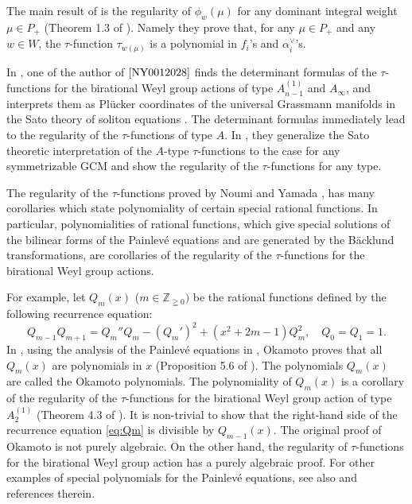 \documentclass[12pt,twoside]{article}
\newcommand\av{\alpha^\vee}
\newcommand\Z{{\mathbb Z}} %
\theoremstyle{plain} %
\theoremstyle{definition} %
\theoremstyle{definition} %
\numberwithin{theorem}{section}
\numberwithin{equation}{section}
\numberwithin{figure}{section}
\numberwithin{table}{section}
\begin{document}
The main result of \cite{NY0012028} is the regularity of $\phi_w(\mu)$ 
for any dominant integral weight $\mu\in P_+$ (Theorem 1.3 of \cite{NY0012028}).
Namely they prove that, for any $\mu\in P_+$ and any $w\in W$, 
the $\tau$-function $\tau_{w(\mu)}$ is a polynomial in $f_i$'s and $\av_i$'s.

In \cite{Yamada9808002}, one of the author of $\cite{NY0012028}$ finds
the determinant formulas of the $\tau$-functions 
for the birational Weyl group actions of type $A^{(1)}_{n-1}$ and $A_\infty$,
and interprets them as Pl\"ucker coordinates of
the universal Grassmann manifolds in the Sato theory of soliton equations \cite{Sato-Sato}.
The determinant formulas immediately lead to 
the regularity of the $\tau$-functions of type $A$.
In \cite{NY0012028}, they generalize the Sato theoretic interpretation of 
the $A$-type $\tau$-functions to the case for any symmetrizable GCM
and show the regularity of the $\tau$-functions for any type.

The regularity of the $\tau$-functions proved by Noumi and Yamada \cite{Yamada9808002}, \cite{NY0012028}
has many corollaries which state polynomiality of certain special rational functions. 
In particular, polynomialities of rational functions, 
which give special solutions of the bilinear forms of the Painlev\'e equations 
and are generated by the B\"acklund transformations, 
are corollaries of the regularity of the $\tau$-functions
for the birational Weyl group actions.

For example, let $Q_m(x)$ ($m\in\Z_{\geqq0})$ be the rational functions 
defined by the following recurrence equation:
\begin{equation}
 Q_{m-1} Q_{m+1} = Q_m'' Q_m - (Q_m')^2 + (x^2+2m-1)Q_m^2,
 \quad Q_0=Q_1=1.
\label{eq:Qm}
\end{equation}
In \cite{OkamotoIII}, 
using the analysis of the Painlev\'e equations in \cite{Okamoto1981},
Okamoto proves that all $Q_m(x)$ are polynomials in $x$
(Proposition 5.6 of \cite{OkamotoIII}).
The polynomials $Q_m(x)$ are called the Okamoto polynomials.
The polynomiality of $Q_m(x)$ is a corollary of the regularity of
the $\tau$-functions for the birational Weyl group action of type $A^{(1)}_2$
(Theorem 4.3 of \cite{NY9708018}).
It is non-trivial to show that 
the right-hand side of the recurrence equation \eqref{eq:Qm} 
is divisible by $Q_{m-1}(x)$.
The original proof of Okamoto is not purely algebraic. 
On the other hand, 
the regularity of $\tau$-functions for the birational Weyl group action
has a purely algebraic proof.
%
For other examples of special polynomials for the Painlev\'e equations, 
see also \cite{Yamada-SP} and references therein.
\end{document}
